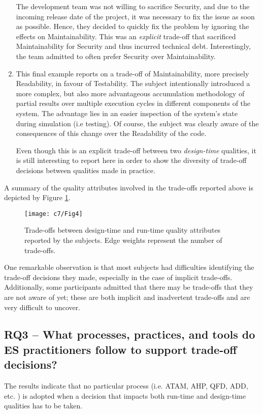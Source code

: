 \begin{enumerate}
    The development team was not willing to sacrifice Security, and due to the incoming release date of the project, it was necessary to fix the issue as soon as possible. Hence, they decided to quickly fix the problem by ignoring the effects on Maintainability. This was an \textit{explicit} trade-off that sacrificed Maintainability for Security and thus incurred technical debt.
    Interestingly, the team admitted to often prefer Security over Maintainability.
    
    \item This final example reports on a trade-off of Maintainability, more precisely Readability, in favour of Testability. %
    The subject intentionally introduced a more complex, but also more advantageous  accumulation methodology of partial results over multiple execution cycles in different components of the system.
    The advantage lies in an easier inspection of the system's state during simulation (i.e testing).
    Of course, the subject was clearly aware of the consequences of this change over the Readability of the code.
    
    Even though this is an explicit trade-off between two \textit{design-time} qualities, it is still interesting to report here in order to show the diversity of trade-off decisions between qualities made in practice.
\end{enumerate}
A summary of the quality attributes involved in the trade-offs reported above is depicted by Figure \ref{c7:fig:trade-offs}.

\begin{figure}
    \centering
    \texttt{[image: c7/Fig4]}
    \caption{Trade-offs between design-time and run-time quality attributes reported by the subjects. Edge weights represent the number of trade-offs.}\label{c7:fig:trade-offs} 
\end{figure}

One remarkable observation is that most subjects had difficulties identifying the trade-off decisions they made, especially in the case of implicit trade-offs. Additionally, some participants admitted that there may be trade-offs that they are not aware of yet; these are both implicit and inadvertent trade-offs and are very difficult to uncover. 

\subsection{RQ3 -- What processes, practices, and tools do ES practitioners follow to support trade-off decisions?}
The results indicate that no particular process (i.e. ATAM, AHP, QFD, ADD, etc. \cite{Barney2012}) is adopted when a decision that impacts both run-time and design-time qualities has to be taken.

